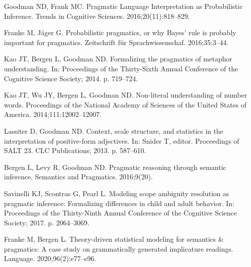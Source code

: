 \documentclass[10pt,letterpaper]{article}
\begin{document}
%
%
% 
\begin{thebibliography}{10}

Goodman ND, Frank MC.
\newblock Pragmatic Language Interpretation as Probabilistic Inference.
\newblock Trends in Cognitive Sciences. 2016;20(11):818--829.

Franke M, J\"{a}ger G.
\newblock Probabilistic pragmatics, or why {B}ayes' rule is probably important
  for pragmatics.
\newblock Zeitschrift f\"{u}r Sprachwissenschaf. 2016;35:3--44.

Kao JT, Bergen L, Goodman ND.
\newblock Formalizing the pragmatics of metaphor understanding.
\newblock In: Proceedings of the Thirty-Sixth Annual Conference of the
  {C}ognitive {S}cience {S}ociety; 2014. p. 719--724.

Kao JT, Wu JY, Bergen L, Goodman ND.
\newblock Non-literal understanding of number words.
\newblock Proceedings of the National Academy of Sciences of the United States
  of America. 2014;111:12002--12007.

Lassiter D, Goodman ND.
\newblock Context, scale structure, and statistics in the interpretation of
  positive-form adjectives.
\newblock In: Snider T, editor. Proceedings of {SALT} 23. CLC Publications;
  2013. p. 587--610.

Bergen L, Levy R, Goodman ND.
\newblock Pragmatic reasoning through semantic inference.
\newblock Semantics and Pragmatics. 2016;9(20).

Savinelli KJ, Scontras G, Pearl L.
\newblock Modeling scope ambiguity resolution as pragmatic inference:
  Formalizing differences in child and adult behavior.
\newblock In: Proceedings of the Thirty-Ninth Annual Conference of the
  {C}ognitive {S}cience {S}ociety; 2017. p. 2064--3069.

Franke M, Bergen L.
\newblock Theory-driven statistical modeling for semantics \& pragmatics: {A}
  case study on grammatically generated implicature readings.
\newblock Language. 2020;96(2):e77--e96.


\end{thebibliography}
\end{document}
